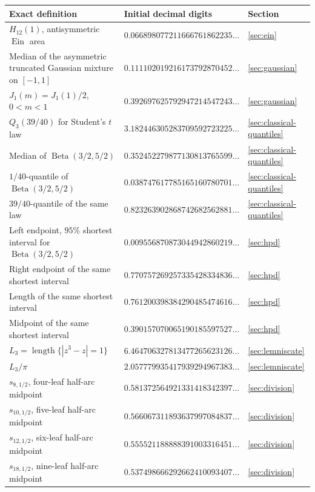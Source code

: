 \documentclass[11pt,a4paper]{article}
\numberwithin{equation}{section}
\theoremstyle{definition}
\theoremstyle{remark}
\newcommand{\Ein}{\operatorname{Ein}}
\newcommand{\length}{\operatorname{length}}
\begin{document}
\begin{longtable}{@{}P{0.48\textwidth}P{0.36\textwidth}P{0.09\textwidth}@{}}
\toprule
Exact definition & Initial decimal digits & Section\\
\midrule
\endhead
$H_{12}(1)$, antisymmetric $\Ein$ area &
$0.066898077211666761862235\ldots$ & \ref{sec:ein}\\
Median of the asymmetric truncated Gaussian mixture on $[-1,1]$ &
$0.111102019216173792870452\ldots$ & \ref{sec:gaussian}\\
$J_1(m)=J_1(1)/2$, $0<m<1$ &
$0.392697625792947214547243\ldots$ & \ref{sec:gaussian}\\
$Q_3(39/40)$ for Student's $t$ law &
$3.182446305283709592723225\ldots$ & \ref{sec:classical-quantiles}\\
Median of $\operatorname{Beta}(3/2,5/2)$ &
$0.352452279877130813765599\ldots$ & \ref{sec:classical-quantiles}\\
$1/40$-quantile of $\operatorname{Beta}(3/2,5/2)$ &
$0.038747617785165160780701\ldots$ & \ref{sec:classical-quantiles}\\
$39/40$-quantile of the same law &
$0.823263902868742682562881\ldots$ & \ref{sec:classical-quantiles}\\
Left endpoint, $95\%$ shortest interval for $\operatorname{Beta}(3/2,5/2)$ &
$0.009556870873044942860219\ldots$ & \ref{sec:hpd}\\
Right endpoint of the same shortest interval &
$0.770757269257335428334836\ldots$ & \ref{sec:hpd}\\
Length of the same shortest interval &
$0.761200398384290485474616\ldots$ & \ref{sec:hpd}\\
Midpoint of the same shortest interval &
$0.390157070065190185597527\ldots$ & \ref{sec:hpd}\\
$L_3=\length\{|z^3-z|=1\}$ &
$6.464706327813477265623126\ldots$ & \ref{sec:lemniscate}\\
$L_3/\pi$ &
$2.057779935417939294967383\ldots$ & \ref{sec:lemniscate}\\
$s_{8,1/2}$, four-leaf half-arc midpoint &
$0.581372564921331418342397\ldots$ & \ref{sec:division}\\
$s_{10,1/2}$, five-leaf half-arc midpoint &
$0.566067311893637997084837\ldots$ & \ref{sec:division}\\
$s_{12,1/2}$, six-leaf half-arc midpoint &
$0.555521188888391003316451\ldots$ & \ref{sec:division}\\
$s_{18,1/2}$, nine-leaf half-arc midpoint &
$0.537498666292662410093407\ldots$ & \ref{sec:division}\\

\end{longtable}
\end{document}

